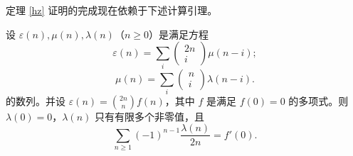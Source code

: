 定理 \ref{hz} 证明的完成现在依赖于下述计算引理。

\begin{lemma}\label{tech}
设 $\varepsilon(n),\mu(n),\lambda(n)$（$n\ge 0$）是满足方程
$$
\varepsilon(n)=\sum_i \begin{pmatrix}2n\\ i\end{pmatrix}
\mu(n-i);
$$
$$
\mu(n)=\sum_i \begin{pmatrix}n\\ i\end{pmatrix}
\lambda(n-i).
$$
的数列。并设 $\varepsilon(n)=\binom{2n}{
  n}f(n)$，其中 $f$ 是满足 $f(0)=0$ 的多项式。则 $\lambda(0)=0$，$\lambda(n)$ 只有有限多个非零值，且
$$
\sum_{n\ge 1} (-1)^{n-1}\frac{\lambda(n)}{2n}=f'(0).
$$
\end{lemma}

